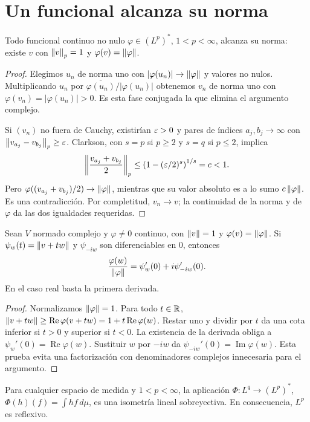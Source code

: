 \section{Un funcional alcanza su norma}\label{lectura:v2-21}
\begin{teorema}\label{v2:lp-alcanza}
Todo funcional continuo no nulo $\varphi\in(L^p)^*$, $1<p<\infty$, alcanza su norma: existe $v$ con $\left\lVert v\right\rVert_p=1$ y $\varphi(v)=\left\lVert\varphi\right\rVert$.
\end{teorema}
\begin{proof}
Elegimos $u_n$ de norma uno con $|\varphi(u_n)|\to\left\lVert\varphi\right\rVert$ y valores no nulos. Multiplicando $u_n$ por $\overline{\varphi(u_n)}/|\varphi(u_n)|$ obtenemos $v_n$ de norma uno con $\varphi(v_n)=|\varphi(u_n)|>0$. Es esta fase conjugada la que elimina el argumento complejo.

Si $(v_n)$ no fuera de Cauchy, existirían $\varepsilon>0$ y pares de índices $a_j,b_j\to\infty$ con $\left\lVert v_{a_j}-v_{b_j}\right\rVert_p\ge\varepsilon$. Clarkson, con $s=p$ si $p\ge2$ y $s=q$ si $p\le2$, implica
\[
 \left\|\frac{v_{a_j}+v_{b_j}}2\right\|_p\le
 \left(1-(\varepsilon/2)^s\right)^{1/s}=c<1.
\]
Pero $\varphi((v_{a_j}+v_{b_j})/2)\to\left\lVert\varphi\right\rVert$, mientras que su valor absoluto es a lo sumo $c\left\lVert\varphi\right\rVert$. Es una contradicción. Por completitud, $v_n\to v$; la continuidad de la norma y de $\varphi$ da las dos igualdades requeridas.
\end{proof}
\begin{lema}[McShane]\label{v2:mcshane}
Sean $V$ normado complejo y $\varphi\ne0$ continuo, con $\left\lVert v\right\rVert=1$ y $\varphi(v)=\left\lVert\varphi\right\rVert$. Si $\psi_w(t)=\left\lVert v+tw\right\rVert$ y $\psi_{-iw}$ son diferenciables en $0$, entonces
\[
 \frac{\varphi(w)}{\left\lVert\varphi\right\rVert}=\psi_w'(0)+i\psi_{-iw}'(0).
\]
En el caso real basta la primera derivada.
\end{lema}
\begin{proof}
Normalizamos $\left\lVert\varphi\right\rVert=1$. Para todo $t\in\mathbb R$, $\left\lVert v+tw\right\rVert\ge\operatorname{Re}\varphi(v+tw)=1+t\operatorname{Re}\varphi(w)$. Restar uno y dividir por $t$ da una cota inferior si $t>0$ y superior si $t<0$. La existencia de la derivada obliga a $\psi_w'(0)=\operatorname{Re}\varphi(w)$. Sustituir $w$ por $-iw$ da $\psi_{-iw}'(0)=\operatorname{Im}\varphi(w)$. Esta prueba evita una factorización con denominadores complejos innecesaria para el argumento.
\end{proof}
\begin{teorema}\label{v2:dual-lp}
Para cualquier espacio de medida y $1<p<\infty$, la aplicación $\Phi:L^q\to(L^p)^*$, $\Phi(h)(f)=\int hf\,d\mu$, es una isometría lineal sobreyectiva. En consecuencia, $L^p$ es reflexivo.
\end{teorema}
